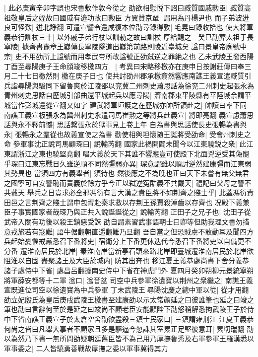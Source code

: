 |{
	此必庚寅辛卯字誤也宋書敷作敦今從之}
劭欲相慰悦下詔曰臧質國戚勲臣|{
	臧質高祖敬皇后之姪故曰國戚有邉功故曰勲臣}
方翼贊京輦|{
	謂用為丹楊尹也}
而子弟波迸良可怪歎|{
	迸北諍翻}
可遣宣譬令還咸復本位劭尋録得敦|{
	毛晃曰録收拾也}
使大將軍義恭行訓杖三十|{
	以外戚子弟行杖以訓勅之故曰訓杖}
厚給賜之　癸巳劭葬太祖于長寧陵|{
	據齊書豫章王嶷傳長寧陵隧道出嶷第前路則陵近臺城矣}
諡曰景皇帝廟號中宗|{
	史不用劭所上諡號而用孝武帝所改諡號正劭弑逆之罪絶之也}
乙未武陵王發西陽丁酉至尋陽庚子王命顔竣移檄四方　|{
	考異曰宋略移檄亦在庚申日按謝莊傳曰奉三月二十七日檄然則檄在庚子日也}
使共討劭州郡承檄翕然響應南譙王義宣遣臧質引兵詣尋陽與駿同下留魯爽於江陵邵以兖冀二州刺史蕭思話為徐兖二州刺史起張永為青州刺史思話自歷城引部曲還平城起兵以應尋陽|{
	濟南郡東平陵縣有平陸城余謂平城當作彭城還從宣翻又如字}
建武將軍垣護之在歷城亦帥所領赴之|{
	帥讀曰率下同}
南譙王義宣板張永為冀州刺史永遣司馬崔勲之等將兵赴義宣|{
	將即亮翻}
義宣慮蕭思話與永不釋前憾|{
	思話繫張永於獄事見上卷上年}
自為書與思話使長史張暢為書與永|{
	張暢永之羣從也故義宣使之為書}
勸使相與坦懷随王誕將受劭命|{
	受會州刺史之命}
參軍事沈正說司馬顧琛曰|{
	說輸芮翻}
國家此禍開闢未聞今以江東驍鋭之衆|{
	此江東謂浙江之東也驍堅堯翻}
唱大義於天下其誰不響應豈可使殿下北面兇逆受其偽寵乎琛曰江東忘戰日久雖逆順不同然彊弱亦異|{
	琛意謂雖以順討逆然建康彊而江東弱其勢異也}
當須四方有義舉者|{
	須待也}
然後應之不為晚也正曰天下未嘗有無父無君之國寧可自安讐恥而責義於餘方乎今正以弑逆寃酷義不共戴天|{
	禮記曰父母之讐不共戴天}
舉兵之日豈求必全邪馮衍有言大漢之貴臣將不如荆齊之賤士乎|{
	此蓋馮衍責田邑之言荆齊之賤士謂申包胥赴秦求救以存荆王孫賈殺淖齒以存齊也}
况殿下義兼臣子事實國家者哉琛乃與正共入說誕誕從之|{
	說輸芮翻}
正田子之兄子也|{
	沈田子從武帝入關有功後以殺王鎮惡受誅}
劭自謂素習武事語朝士曰卿等但助我理文書勿措意戎旅若有寇難|{
	語牛倨翻朝直遥翻難乃旦翻}
吾自當之但恐賊虜不敢動耳及聞四方兵起始憂懼戒嚴悉召下番將吏|{
	宿衛分上下番更休迭代今悉召下番將吏以自備更不分番}
遷淮南居民於北岸|{
	秦淮南岸當新亭石頭來路北岸即臺城遷淮南居民於北岸欲阻淮以自固}
盡聚諸王及大臣於城内|{
	防其出奔也}
移江夏王義恭處尚書下舍分義恭諸子處侍中下省|{
	處昌呂翻據南史侍中下省在神虎門外}
夏四月癸卯朔柳元景統寧朔將軍薛安都等十二軍湓口|{
	湓音盆}
司空中兵參軍徐遺寶以荆州之衆繼之|{
	南譙王義宣既進位司空以徐遺寶為中兵參軍}
丁未武陵王尋陽沈慶之總中軍以從|{
	從才用翻}
劭立妃殷氏為皇后庚戍武陵王檄書至建康劭以示太常顔延之曰彼誰筆也延之曰竣之筆也劭曰言辭何至於是延之曰竣尚不顧老臣安能顧陛下劭怒稍解悉拘武陵王子於侍中下省南譙王義宣子於太倉空舍劭欲盡殺三鎮士民家口|{
	三鎮謂雍荆江}
江夏王義恭何尚之皆曰凡舉大事者不顧家且多是驅逼今忽誅其室累正足堅彼意耳|{
	累切瑞翻}
劭以為然乃下書一無所問劭疑朝廷舊臣皆不為己用乃厚撫魯秀及右軍參軍王羅漢悉以軍事委之|{
	二人皆驍勇善戰故厚撫之委以軍事冀得其力}
